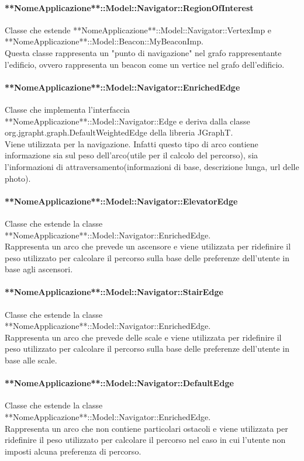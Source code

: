 \documentclass[../SpecificaTecnica.tex]{subfiles}
\begin{document}
				\paragraph{**NomeApplicazione**::Model::Navigator::RegionOfInterest}
					Classe che estende **NomeApplicazione**::Model::Navigator::VertexImp e **NomeApplicazione**::Model::Beacon::MyBeaconImp. \\
					Questa classe rappresenta un "punto di navigazione" nel grafo rappresentante l'edificio, ovvero rappresenta un beacon come un vertice nel grafo dell'edificio.
				\paragraph{**NomeApplicazione**::Model::Navigator::EnrichedEdge}
					Classe che implementa l'interfaccia **NomeApplicazione**::Model::Navigator::Edge e deriva dalla classe org.jgrapht.graph.DefaultWeightedEdge della libreria JGraphT. \\
					Viene utilizzata per la navigazione. Infatti questo tipo di arco contiene informazione sia sul peso dell'arco(utile per il calcolo del percorso), sia l'informazioni di attraversamento(informazioni di base, descrizione lunga, url delle photo).
				\paragraph{**NomeApplicazione**::Model::Navigator::ElevatorEdge}
					Classe che estende la classe **NomeApplicazione**::Model::Navigator::EnrichedEdge. \\
					Rappresenta un arco che prevede un ascensore e viene utilizzata per ridefinire il peso utilizzato per calcolare il percorso sulla base delle preferenze dell'utente in base agli ascensori.
				\paragraph{**NomeApplicazione**::Model::Navigator::StairEdge}
					Classe che estende la classe **NomeApplicazione**::Model::Navigator::EnrichedEdge. \\
					Rappresenta un arco che prevede delle scale e viene utilizzata per ridefinire il peso utilizzato per calcolare il percorso sulla base delle preferenze dell'utente in base alle scale.
				\paragraph{**NomeApplicazione**::Model::Navigator::DefaultEdge}
					Classe che estende la classe **NomeApplicazione**::Model::Navigator::EnrichedEdge. \\
					Rappresenta un arco che non contiene particolari ostacoli e viene utilizzata per ridefinire il peso utilizzato per calcolare il percorso nel caso in cui l'utente non imposti alcuna preferenza di percorso.
\end{document}
